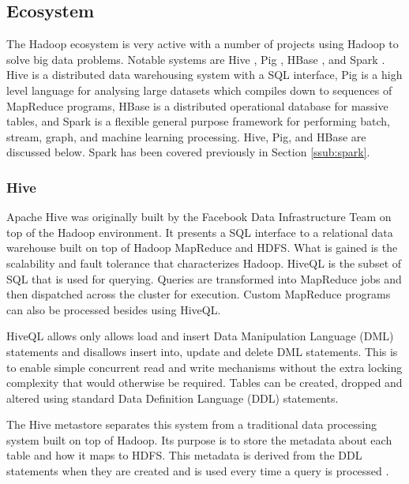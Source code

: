 \documentclass[12pt]{article}
\begin{document}
\subsection{Ecosystem} \label{sub:ecosystem}

The Hadoop ecosystem is very active with a number of projects using Hadoop to solve big data problems. Notable systems are Hive \cite{thusoo2009hive}, Pig \cite{olston2008pig}, HBase \cite{chang2008bigtable}, and Spark \cite{zaharia2010spark}. Hive is a distributed data warehousing system with a SQL interface, Pig is a high level language for analysing large datasets which compiles down to sequences of MapReduce programs, HBase is a distributed operational database for massive tables, and Spark is a flexible general purpose framework for performing batch, stream, graph, and machine learning processing. Hive, Pig, and HBase are discussed below. Spark has been covered previously in Section \ref{ssub:spark}.



\subsubsection{Hive} \label{ssub:hive}

Apache Hive \cite{thusoo2009hive,sakr2013hadoop} was originally built by the Facebook Data Infrastructure Team on top of the Hadoop environment. It presents a SQL interface to a relational data warehouse built on top of Hadoop MapReduce and HDFS. What is gained is the scalability and fault tolerance that characterizes Hadoop. HiveQL is the subset of SQL that is used for querying. Queries are transformed into MapReduce jobs and then dispatched across the cluster for execution. Custom MapReduce programs can also be processed besides using HiveQL.

HiveQL allows only allows load and insert Data Manipulation Language (DML) statements and disallows insert into, update and delete DML statements. This is to enable simple concurrent read and write mechanisms without the extra locking complexity that would otherwise be required. Tables can be created, dropped and altered using standard Data Definition Language (DDL) statements.

The Hive metastore separates this system from a traditional data processing system built on top of Hadoop. Its purpose is to store the metadata about each table and how it maps to HDFS. This metadata is derived from the DDL statements when they are created and is used every time a query is processed \cite{sakr2013hadoop}.
\end{document}
